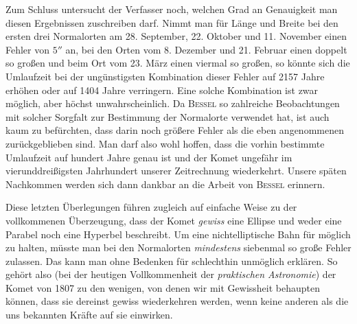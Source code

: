 Zum Schluss untersucht der Verfasser noch, welchen Grad an Genauigkeit man diesen Ergebnissen zuschreiben darf. Nimmt man für Länge und Breite bei den ersten drei Normalorten am 28. September, 22. Oktober und 11. November einen Fehler von $5''$ an, bei den Orten vom 8. Dezember und 21. Februar einen doppelt so großen und beim Ort vom 23. März einen viermal so großen, so könnte sich die Umlaufzeit bei der ungünstigsten Kombination dieser Fehler auf 2157 Jahre erhöhen oder auf 1404 Jahre verringern. Eine solche Kombination ist zwar möglich, aber höchst unwahrscheinlich. Da \textsc{Bessel} so zahlreiche Beobachtungen mit solcher Sorgfalt zur Bestimmung der Normalorte verwendet hat, ist auch kaum zu befürchten, dass darin noch größere Fehler als die eben angenommenen zurückgeblieben sind. Man darf also wohl hoffen, dass die vorhin bestimmte Umlaufzeit auf hundert Jahre genau ist und der Komet ungefähr im vierunddreißigsten Jahrhundert unserer Zeitrechnung wiederkehrt. Unsere späten Nachkommen werden sich dann dankbar an die Arbeit von \textsc{Bessel} erinnern.

Diese letzten Überlegungen führen zugleich auf einfache Weise zu der vollkommenen Überzeugung, dass der Komet \emph{gewiss} eine Ellipse und weder eine Parabel noch eine Hyperbel beschreibt. Um eine nichtelliptische Bahn für möglich zu halten, müsste man bei den Normalorten \emph{mindestens} siebenmal so große Fehler zulassen. Das kann man ohne Bedenken für schlechthin unmöglich erklären. So gehört also (bei der heutigen Vollkommenheit der \emph{praktischen Astronomie}) der Komet von 1807 zu den wenigen, von denen wir mit Gewissheit behaupten können, dass sie dereinst gewiss wiederkehren werden, wenn keine anderen als die uns bekannten Kräfte auf sie einwirken.
